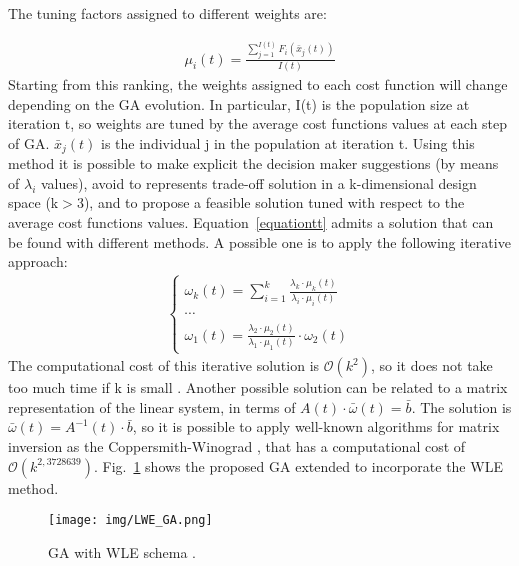 The tuning factors assigned to different weights are: \par
%
\begin{equation} \label{equationtt2}
    \begin{aligned}
        \mu_i(t) = \frac{\sum_{j=1}^{I(t)} F_i(\bar x_j(t))}{I(t)}
    \end{aligned}
\end{equation}
%
Starting from this ranking, the weights assigned to each cost function will change depending on the GA evolution. In particular, I(t) is the population size at iteration t, so weights are tuned by the average cost functions values at each step of GA. $\bar x_j(t)$ is the individual j in the population at iteration t. Using this method it is possible to make explicit the decision maker suggestions (by means of $\lambda_i$ values), avoid to represents trade-off solution in a k-dimensional design space (k$>$3), and to propose a feasible solution tuned with respect to the average cost functions values. Equation~\ref{equationtt} admits a solution that can be found with different methods. A possible one is to apply the following iterative approach:
%
\begin{equation} \label{equationtt3}
    \begin{aligned}
        \begin{cases} 
            \omega_k(t) = \sum_{i=1}^k \frac{\lambda_k \cdot \mu_k(t)}{\lambda_i \cdot \mu_i(t)} \\
            \cdots \\
            \omega_1(t) = \frac{\lambda_2 \cdot \mu_2(t)}{\lambda_{1} \cdot \mu_{1}(t)} \cdot \omega_2(t)
        \end{cases} 
\end{aligned}
\end{equation}
%
The computational cost of this iterative solution is $\mathcal{O}(k^2)$, so it  does not take too much time if k is small \cite{Jacobi}. Another possible solution can be related to a matrix representation of the linear system, in terms of $ A(t) \cdot \bar \omega(t) = \bar b$. The solution is $\bar \omega(t) = A^{-1}(t) \cdot \bar b$, so it is possible to apply well-known algorithms for matrix inversion as the Coppersmith-Winograd \cite{copper}, that has a computational cost of $\mathcal{O}(k^{2,3728639})$. Fig.~\ref{lwe_ga} shows the proposed GA extended to incorporate the WLE method.
%
\begin{figure}[htbp]
	\centerline{\texttt{[image: img/LWE\_GA.png]}}
	\caption{GA with WLE schema \cite{parma_ditam_2019}.}
	\label{lwe_ga}
\end{figure}
%
